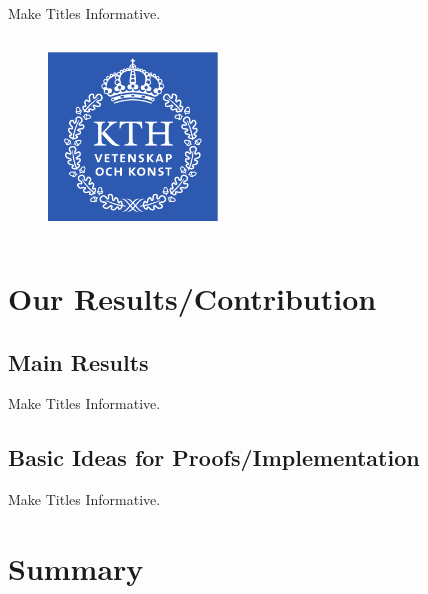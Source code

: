 \documentclass{beamer}
\begin{document}
\begin{frame}{Make Titles Informative.}
\begin{columns}[T]
\begin{minipage}[c][0.35\textheight][c]{0.9\textwidth}
\begin{figure}
          \includegraphics[width=0.4\textwidth]{img/logo.pdf}
        \end{figure}
      \end{minipage}
  \end{columns}
\end{frame}

\section{Our Results/Contribution}

\subsection{Main Results}

\begin{frame}{Make Titles Informative.}
\end{frame}

\subsection{Basic Ideas for Proofs/Implementation}

\begin{frame}{Make Titles Informative.}
\end{frame}

\section*{Summary}
\end{document}
